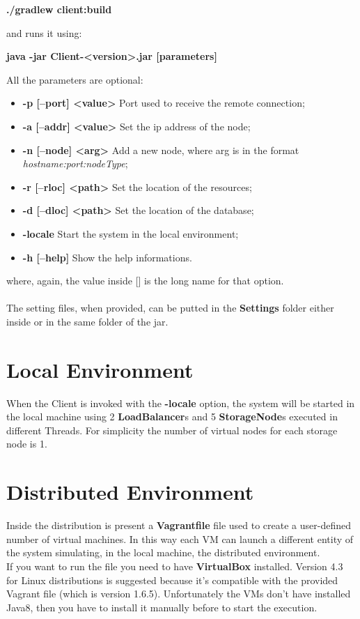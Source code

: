\documentclass[12pt, a4paper, oneside] {book}
\begin{document}
\begin{center}
\textbf{./gradlew client:build}
\end{center}
and runs it using:

\begin{center}
\textbf{java -jar Client-<version>.jar [parameters]}
\end{center}
All the parameters are optional:

\begin{itemize}
  \item \textbf{-p [--port] <value>} Port used to receive the remote connection;
  \item \textbf{-a [--addr] <value>} Set the ip address of the node;
  \item \textbf{-n [--node] <arg>} Add a new node, where arg is in the format \emph{hostname:port:nodeType};
  \item \textbf{-r [--rloc] <path>} Set the location of the resources;
  \item \textbf{-d [--dloc] <path>} Set the location of the database;
  \item \textbf{-locale} Start the system in the local environment;
  \item \textbf{-h [--help]} Show the help informations.
\end{itemize}
where, again, the value inside [] is the long name for that option.\\\\
The setting files, when provided, can be putted in the \textbf{Settings} folder either inside or in the same folder of the jar.

\section{Local Environment}

When the Client is invoked with the \textbf{-locale} option, the system will be started in the local machine using 2 \textbf{LoadBalancer}s and 5 \textbf{StorageNode}s
executed in different Threads. For simplicity the number of virtual nodes for each storage node is 1.


\section{Distributed Environment}

Inside the distribution is present a \textbf{Vagrantfile} file used to create a user-defined number of virtual machines.
In this way each VM can launch a different entity of the system simulating, in the local machine, the distributed environment.\\
If you want to run the file you need to have \textbf{VirtualBox} installed. Version 4.3 for Linux distributions is suggested because it's compatible with the provided Vagrant file (which is version 1.6.5).
Unfortunately the VMs don't have installed Java8, then you have to install it manually before to start the execution.
\end{document}
